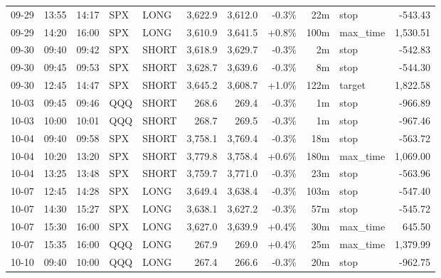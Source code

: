 \documentclass[11pt,a4paper,twoside]{article}
\begin{document}
\begin{center}
\begin{longtable}{>{\color{txtmain}}l l l l l r r r r >{\color{txtmain}}l r}
09-29 & 13:55 & 14:17 & SPX & LONG & 3,622.9 & 3,612.0 & \textcolor{lossred}{-0.3\%} & 22m & stop & \textcolor{lossred}{-543.43} \\
09-29 & 14:20 & 16:00 & SPX & LONG & 3,610.9 & 3,641.5 & \textcolor{wingreen}{+0.8\%} & 100m & max\_time & \textcolor{wingreen}{1,530.51} \\
09-30 & 09:40 & 09:42 & SPX & SHORT & 3,618.9 & 3,629.7 & \textcolor{lossred}{-0.3\%} & 2m & stop & \textcolor{lossred}{-542.83} \\
09-30 & 09:45 & 09:53 & SPX & SHORT & 3,628.7 & 3,639.6 & \textcolor{lossred}{-0.3\%} & 8m & stop & \textcolor{lossred}{-544.30} \\
09-30 & 12:45 & 14:47 & SPX & SHORT & 3,645.2 & 3,608.7 & \textcolor{wingreen}{+1.0\%} & 122m & target & \textcolor{wingreen}{1,822.58} \\
10-03 & 09:45 & 09:46 & QQQ & SHORT & 268.6 & 269.4 & \textcolor{lossred}{-0.3\%} & 1m & stop & \textcolor{lossred}{-966.89} \\
10-03 & 10:00 & 10:01 & QQQ & SHORT & 268.7 & 269.5 & \textcolor{lossred}{-0.3\%} & 1m & stop & \textcolor{lossred}{-967.46} \\
10-04 & 09:40 & 09:58 & SPX & SHORT & 3,758.1 & 3,769.4 & \textcolor{lossred}{-0.3\%} & 18m & stop & \textcolor{lossred}{-563.72} \\
10-04 & 10:20 & 13:20 & SPX & SHORT & 3,779.8 & 3,758.4 & \textcolor{wingreen}{+0.6\%} & 180m & max\_time & \textcolor{wingreen}{1,069.00} \\
10-04 & 13:25 & 13:48 & SPX & SHORT & 3,759.7 & 3,771.0 & \textcolor{lossred}{-0.3\%} & 23m & stop & \textcolor{lossred}{-563.96} \\
10-07 & 12:45 & 14:28 & SPX & LONG & 3,649.4 & 3,638.4 & \textcolor{lossred}{-0.3\%} & 103m & stop & \textcolor{lossred}{-547.40} \\
10-07 & 14:30 & 15:27 & SPX & LONG & 3,638.1 & 3,627.2 & \textcolor{lossred}{-0.3\%} & 57m & stop & \textcolor{lossred}{-545.72} \\
10-07 & 15:30 & 16:00 & SPX & LONG & 3,627.0 & 3,639.9 & \textcolor{wingreen}{+0.4\%} & 30m & max\_time & \textcolor{wingreen}{645.50} \\
10-07 & 15:35 & 16:00 & QQQ & LONG & 267.9 & 269.0 & \textcolor{wingreen}{+0.4\%} & 25m & max\_time & \textcolor{wingreen}{1,379.99} \\
10-10 & 09:40 & 10:00 & QQQ & LONG & 267.4 & 266.6 & \textcolor{lossred}{-0.3\%} & 20m & stop & \textcolor{lossred}{-962.75} \\

\end{longtable}
\end{center}
\end{document}
